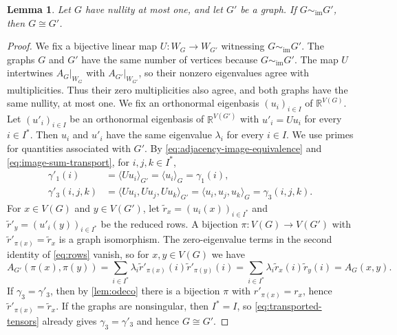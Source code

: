 \documentclass[10pt,a4paper]{article}
\theoremstyle{plain}
\newtheorem{lemma}[theorem]{Lemma}
\theoremstyle{definition}
\newcommand{\R}{\mathbb{R}}
\begin{document}
\begin{lemma}\label{lem:reconstruction}
 Let $G$ have nullity at most one, and let $G'$ be a graph.
 If $G\sim_{\mathrm{im}}G'$, then $G\cong G'$.
\end{lemma}
\begin{proof}
  We fix a bijective linear map $U:W_G\to W_{G'}$ witnessing
  $G\sim_{\mathrm{im}}G'$.
  The graphs $G$ and $G'$ have the same number of vertices because
  $G\sim_{\mathrm{im}}G'$. The map $U$ intertwines
  $A_G|_{W_G}$ with $A_{G'}|_{W_{G'}}$, so their nonzero eigenvalues agree
  with multiplicities. Thus their zero multiplicities also agree,
  and both graphs have the same nullity, at most one.
  We fix an orthonormal eigenbasis
  $(u_i)_{i\in I}$ of $\R^{V(G)}$.
  Let $(u'_i)_{i\in I}$ be an orthonormal eigenbasis of $\R^{V(G')}$
  with $u'_i=Uu_i$ for every $i\in I^*$.
  Then $u_i$ and $u'_i$ have the same eigenvalue $\lambda_i$ for every
  $i\in I$. We use primes for quantities associated with $G'$.
  By \cref{eq:adjacency-image-equivalence} and
  \cref{eq:image-sum-transport}, for $i,j,k\in I^*$,
  \begin{equation}\label{eq:transported-tensors}
    \begin{aligned}
      \gamma'_1(i)&=\langle Uu_i\rangle_{G'}
        =\langle u_i\rangle_G=\gamma_1(i),\\
      \gamma'_3(i,j,k)&=\langle Uu_i,Uu_j,Uu_k\rangle_{G'}
        =\langle u_i,u_j,u_k\rangle_G=\gamma_3(i,j,k).
    \end{aligned}
  \end{equation}
  For $x\in V(G)$ and $y\in V(G')$, let
  $\tilde{r}_x=(u_i(x))_{i\in I^*}$ and
  $\tilde{r}'_y=(u'_i(y))_{i\in I^*}$ be the reduced rows.
  A bijection $\pi:V(G)\to V(G')$ with $\tilde{r}'_{\pi(x)}=\tilde{r}_x$ is a
  graph isomorphism. The zero-eigenvalue terms in the second identity of
  \cref{eq:rows} vanish, so for $x,y\in V(G)$ we have
  \begin{equation}\label{eq:row-isomorphism}
    A_{G'}(\pi(x),\pi(y))
    =\sum_{i\in I^*}\lambda_i\tilde{r}'_{\pi(x)}(i)\tilde{r}'_{\pi(y)}(i)
    =\sum_{i\in I^*}\lambda_i\tilde{r}_x(i)\tilde{r}_y(i)=A_G(x,y).
  \end{equation}
  If $\gamma_3=\gamma'_3$, then by \cref{lem:odeco} there is a
  bijection $\pi$ with $r'_{\pi(x)}=r_x$, hence $\tilde{r}'_{\pi(x)}=\tilde{r}_x$.
  If the graphs are nonsingular, then $I^*=I$, so
  \cref{eq:transported-tensors} already gives $\gamma_3=\gamma'_3$
  and hence $G\cong G'$.


\end{proof}
\end{document}
